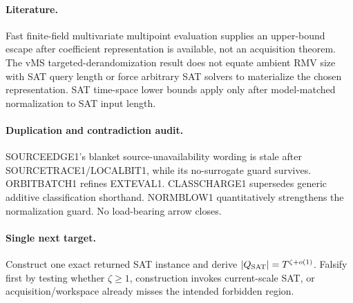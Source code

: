 \documentclass[11pt]{article}
\begin{document}
\paragraph{Literature.} Fast finite-field multivariate multipoint evaluation supplies an upper-bound escape after coefficient representation is available, not an acquisition theorem. The vMS targeted-derandomization result does not equate ambient RMV size with SAT query length or force arbitrary SAT solvers to materialize the chosen representation. SAT time-space lower bounds apply only after model-matched normalization to SAT input length.

\paragraph{Duplication and contradiction audit.} SOURCEEDGE1's blanket source-unavailability wording is stale after SOURCETRACE1/LOCALBIT1, while its no-surrogate guard survives. ORBITBATCH1 refines EXTEVAL1. CLASSCHARGE1 supersedes generic additive classification shorthand. NORMBLOW1 quantitatively strengthens the normalization guard. No load-bearing arrow closes.

\paragraph{Single next target.} Construct one exact returned SAT instance and derive $|Q_{\rm SAT}|=T^{\zeta+o(1)}$. Falsify first by testing whether $\zeta\ge1$, construction invokes current-scale SAT, or acquisition/workspace already misses the intended forbidden region.

\end{document}

